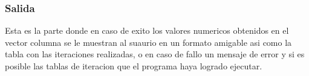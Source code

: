 \documentclass[11pt]{article}
\begin{document}
\subsubsection{Salida}
Esta es la parte donde en caso de exito los valores numericos obtenidos en el vector columna se le muestran al suaurio en un formato amigable asi como la tabla con las iteraciones realizadas, o en caso de fallo un mensaje de error y si es posible las tablas de iteracion que el programa haya logrado ejecutar.  
\clearpage

\nocite{*}

\end{document}
